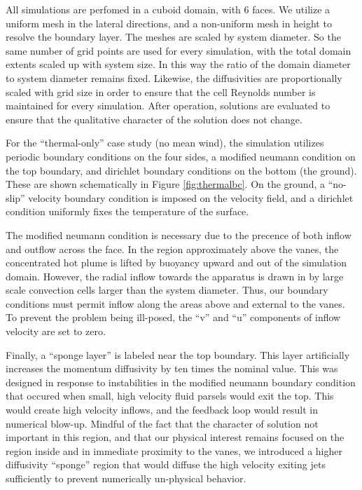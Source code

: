 All simulations are perfomed in a cuboid domain, with 6 faces. We
utilize a uniform mesh in the lateral directions, and a non-uniform mesh
in height to resolve the boundary layer. The meshes are scaled by system
diameter. So the same number of grid points are used for every
simulation, with the total domain extents scaled up with system size. In
this way the ratio of the domain diameter to system diameter remains
fixed. Likewise, the diffusivities are proportionally scaled with grid
size in order to ensure that the cell Reynolds number is maintained for
every simulation. After operation, solutions are evaluated to ensure
that the qualitative character of the solution does not change. 


%
%

For the ``thermal-only'' case study (no mean wind), the simulation
utilizes periodic boundary conditions on the four sides, a modified
neumann condition on the top boundary, and dirichlet boundary conditions
on the bottom (the ground). These are shown schematically in Figure
\ref{fig:thermalbc}. On the ground, a ``no-slip'' velocity boundary
condition is imposed on the velocity field, and a dirichlet condition
uniformly fixes the temperature of the surface. 

The modified neumann condition is necessary due to the precence of both
inflow and outflow across the face. In the region approximately above
the vanes, the concentrated hot plume is lifted by buoyancy
upward and out of the simulation domain. However, the radial inflow
towards the apparatus is drawn in by large scale convection cells larger
than the system diameter. Thus, our boundary conditions must permit
inflow along the areas above and external to the vanes. To prevent the
problem being ill-posed, the ``v'' and ``u'' components of inflow
velocity are set to zero. 

Finally, a ``sponge layer'' is labeled near the top boundary. This layer
artificially increases the momentum diffusivity by ten times the nominal
value. This was designed in response to instabilities in the modified
neumann boundary condition that occured when small, high velocity fluid
parsels would exit the top. This would create high velocity inflows, and
the feedback loop would result in numerical blow-up. Mindful of the fact
that the character of solution not important in this region, and that
our physical interest remains focused on the region inside and
in immediate proximity to the vanes, we introduced a higher diffusivity
``sponge'' region that would diffuse the high velocity exiting jets
sufficiently to prevent numerically un-physical behavior. 

